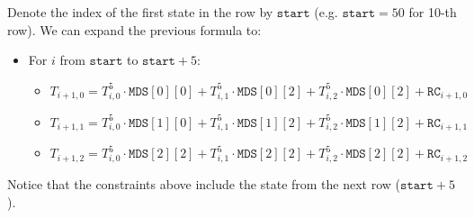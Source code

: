 Denote the index of the first state in the row by $\texttt{start}$ (e.g. $\texttt{start}=50$ for 10-th row).
We can expand the previous formula to:
\begin{itemize}
    \item For $i$ from $\texttt{start}$ to $\texttt{start} + 5$:
    \begin{itemize}
        \item $T_{i + 1, 0} = T_{i, 0}^5 \cdot \texttt{MDS}[0][0] + T_{i, 1}^5 \cdot
        \texttt{MDS}[0][2] + T_{i, 2}^5 \cdot \texttt{MDS}[0][2] + \texttt{RC}_{i + 1, 0}$
        \item $T_{i + 1, 1} = T_{i, 0}^5 \cdot \texttt{MDS}[1][0] + T_{i, 1}^5 \cdot
        \texttt{MDS}[1][2] + T_{i, 2}^5 \cdot \texttt{MDS}[1][2] + \texttt{RC}_{i + 1, 1}$
        \item $T_{i + 1, 2} = T_{i, 0}^5 \cdot \texttt{MDS}[2][2] + T_{i, 1}^5 \cdot
        \texttt{MDS}[2][2] + T_{i, 2}^5 \cdot \texttt{MDS}[2][2] + \texttt{RC}_{i + 1, 2}$
    \end{itemize}
\end{itemize}

Notice that the constraints above include the state from the next row ($\texttt{start} + 5$).